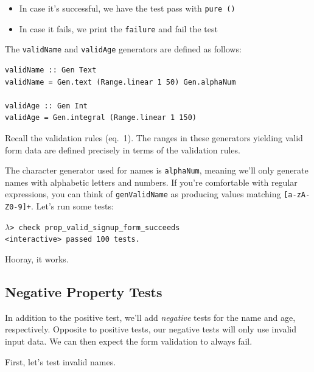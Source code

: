 \begin{itemize}
\item
  In case it's successful, we have the test pass with \texttt{pure\ ()}
\item
  In case it fails, we print the \texttt{failure\textquotesingle{}} and
  fail the test
\end{itemize}

The \texttt{validName} and \texttt{validAge} generators are defined as
follows:

\begin{verbatim}
validName :: Gen Text
validName = Gen.text (Range.linear 1 50) Gen.alphaNum

validAge :: Gen Int
validAge = Gen.integral (Range.linear 1 150)
\end{verbatim}
Recall the validation rules (eq.~1). The ranges in these generators
yielding valid form data are defined precisely in terms of the
validation rules.

The character generator used for names is \texttt{alphaNum}, meaning
we'll only generate names with alphabetic letters and numbers. If you're
comfortable with regular expressions, you can think of
\texttt{genValidName} as producing values matching
\texttt{{[}a-zA-Z0-9{]}+}.
Let's run some tests:

\vspace{\baselineskip}

\begin{minipage}[l]{\textwidth}
\noindent$\lambda$\verb|> check prop_valid_signup_form_succeeds| \\
  \hspace*{1cm}\checkmark \verb|<interactive> passed 100 tests.|
\end{minipage}

\vspace{\baselineskip}

\noindent Hooray, it works.

\subsection{Negative Property Tests}
\label{negative-property-tests}

In addition to the positive test, we'll add \emph{negative} tests for
the name and age, respectively. Opposite to positive tests, our negative
tests will only use invalid input data. We can then expect the form
validation to always fail.

First, let's test invalid names.

